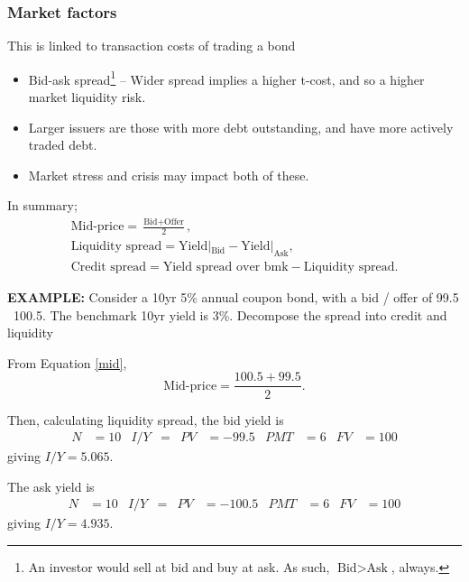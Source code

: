 \documentclass[../notes_compiled.tex]{subfiles}
\begin{document}
\subsubsection*{Market factors}
\begin{itemize}
\item This is linked to transaction costs of trading a bond
\begin{itemize}
\item Bid-ask spread\footnote{An investor would sell at bid and buy at ask. As such, $\text{Bid} > \text{Ask}$, always.} -- Wider spread implies a higher t-cost, and so a higher market liquidity risk.
\item Larger issuers are those with more debt outstanding, and have more actively traded debt.
\item Market stress and crisis may impact both of these.
\end{itemize}


\item In summary;
\begin{gather*}
\text{Mid-price} = \frac{\text{Bid} + \text{Offer}}{2}, \label{mid}\\
\text{Liquidity spread} = \text{Yield}|_{\text{Bid}} - \text{Yield}|_{\text{Ask}}, \label{liq-spread} \\
\text{Credit spread} = \text{Yield spread over bmk} - \text{Liquidity spread}. \label{credit-spread}
\end{gather*}


{\color{RedViolet}
\item[] \textbf{EXAMPLE:} Consider a 10yr 5\% annual coupon bond, with a bid / offer of 99.5 \ 100.5. The benchmark 10yr yield is 3\%. Decompose the spread into credit and liquidity
}

{\color{RoyalBlue}
\item[] From Equation \ref{mid},
\begin{equation*}
\text{Mid-price} = \frac{100.5 + 99.5}{2}.
\end{equation*}

Then, calculating liquidity spread, the bid yield is
\begin{align*}
N&=10  & I / Y &= & PV &=-99.5 & PMT &=6 & FV &=100
\end{align*}
giving $I / Y = 5.065$.

\item[] The ask yield is
\begin{align*}
N&=10  & I / Y &= & PV &=-100.5 & PMT &=6 & FV &=100
\end{align*}
giving $I / Y = 4.935$.

}
\end{itemize}
\end{document}
